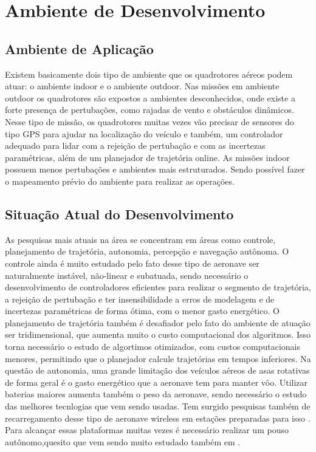 \chapter{Ambiente de Desenvolvimento}
\label{chap:ambiente}

\section{Ambiente de Aplicação}

Existem basicamente dois tipo de ambiente que os quadrotores aéreos podem atuar: o ambiente indoor e o ambiente outdoor. Nas missões em ambiente outdoor os quadrotores são expostos a ambientes desconhecidos, onde existe a forte presença de pertubações, como rajadas de vento e obstáculos dinâmicos. Nesse tipo de missão, os quadrotores muitas vezes vão precisar de sensores do tipo GPS para ajudar na localização do veículo e também, um controlador adequado para lidar com a rejeição de pertubação e com as incertezas paramétricas, além de um planejador de trajetória online. As missões indoor possuem menos pertubações e ambientes mais estruturados. Sendo possível fazer o mapeamento prévio do ambiente para realizar as operações.

\section{Situação Atual do Desenvolvimento}

As pesquisas mais atuais na área se concentram em áreas como controle, planejamento de trajetória, autonomia, percepção e navegação autônoma. O controle ainda é muito estudado pelo fato desse tipo de aeronave ser naturalmente instável, não-linear e subatuada, sendo necessário o desenvolvimento de controladores eficientes para realizar o segmento de trajetória, a rejeição de pertubação e ter insensibilidade a erros de modelagem e de incertezas paramétricas de forma ótima, com o menor gasto energético. O planejamento de trajetória também é desafiador pelo fato do ambiente de atuação ser tridimensional, que aumenta muito o custo computacional dos algoritmos. Isso torna necessário o estudo de algortimos otimizados, com custos computacionais menores, permitindo que o planejador calcule trajetórias em tempos inferiores. Na questão de autonomia, uma grande limitação dos veículos aéreos de asas rotativas de forma geral é o gasto energético que a aeronave tem para manter vôo. Utilizar baterias maiores aumenta também o peso da aeronave, sendo necessário o estudo das melhores tecnlogias que vem sendo usadas. Tem surgido pesquisas também de recarregamento desse tipo de aeronave wireless em estações preparadas para isso \cite{Mulgaonkar2014,Sierra2019,Abdilla2015b}. Para alcançar essas plataformas muitas vezes é necessário realizar um pouso autônomo,quesito que vem sendo muito estudado também em \cite{Lim2021,Simon2018,Falanga2017a,Jin2016a,Serra2016a,Kim2016,Ling2014,Serra2014,Herisse2012}.

